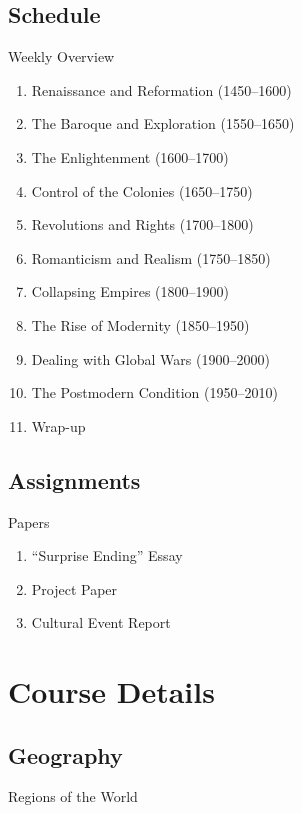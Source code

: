 

\subsection{Schedule}
\begin{frame}{Weekly Overview}
	\begin{enumerate}
		\item<1->Renaissance and Reformation (1450--1600)	%
		\item<2->The Baroque and Exploration (1550--1650)	%
		\item<3->The Enlightenment (1600--1700)				%
		\item<4->Control of the Colonies (1650--1750)		%
		\item<5->Revolutions and Rights (1700--1800)		%
		\item<6->Romanticism and Realism (1750--1850)		%
		\item<7->Collapsing Empires (1800--1900)			%
		\item<8->The Rise of Modernity (1850--1950)			%
		\item<9->Dealing with Global Wars (1900--2000)		%
		\item<10->The Postmodern Condition (1950--2010)		%
		\item<11->Wrap-up									%
	\end{enumerate}
\end{frame}

\subsection{Assignments}
\begin{frame}{Papers}
	\begin{enumerate}
		\item<1->``Surprise Ending'' Essay
		\item<2->Project Paper
		\item<3->Cultural Event Report
	\end{enumerate}
\end{frame}

\section{Course Details}
\subsection{Geography}
\begin{frame}{Regions of the World}
\end{frame}

